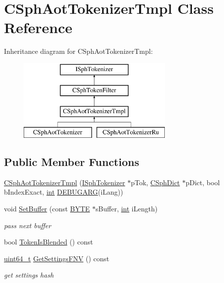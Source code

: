 \hypertarget{classCSphAotTokenizerTmpl}{\section{C\-Sph\-Aot\-Tokenizer\-Tmpl Class Reference}
\label{classCSphAotTokenizerTmpl}
}
Inheritance diagram for C\-Sph\-Aot\-Tokenizer\-Tmpl\-:\begin{figure}[H]
\begin{center}
\leavevmode
\includegraphics[height=4.000000cm]{classCSphAotTokenizerTmpl}
\end{center}
\end{figure}
\subsection*{Public Member Functions}
\begin{DoxyCompactItemize}
\item 
\hyperlink{classCSphAotTokenizerTmpl_a7d4f80459207176ec823dd7f81b8260f}{C\-Sph\-Aot\-Tokenizer\-Tmpl} (\hyperlink{classISphTokenizer}{I\-Sph\-Tokenizer} $\ast$p\-Tok, \hyperlink{classCSphDict}{C\-Sph\-Dict} $\ast$p\-Dict, bool b\-Index\-Exact, \hyperlink{sphinxexpr_8cpp_a4a26e8f9cb8b736e0c4cbf4d16de985e}{int} \hyperlink{sphinxstd_8h_aea24330ad33ca20415a6729b2e46ef2d}{D\-E\-B\-U\-G\-A\-R\-G}(i\-Lang))
\item 
void \hyperlink{classCSphAotTokenizerTmpl_acf6f6e296f3e034c3c09081f8f566648}{Set\-Buffer} (const \hyperlink{sphinxstd_8h_a4ae1dab0fb4b072a66584546209e7d58}{B\-Y\-T\-E} $\ast$s\-Buffer, \hyperlink{sphinxexpr_8cpp_a4a26e8f9cb8b736e0c4cbf4d16de985e}{int} i\-Length)
\begin{DoxyCompactList}\small\item\em pass next buffer \end{DoxyCompactList}\item 
bool \hyperlink{classCSphAotTokenizerTmpl_a899c57ec1ab2b3d6e66220d049ac09cc}{Token\-Is\-Blended} () const 
\item 
\hyperlink{sphinxstd_8h_aaa5d1cd013383c889537491c3cfd9aad}{uint64\-\_\-t} \hyperlink{classCSphAotTokenizerTmpl_ae1decc1ff015ab05493e561fe2d70c4f}{Get\-Settings\-F\-N\-V} () const 
\begin{DoxyCompactList}\small\item\em get settings hash \end{DoxyCompactList}\end{DoxyCompactItemize}
